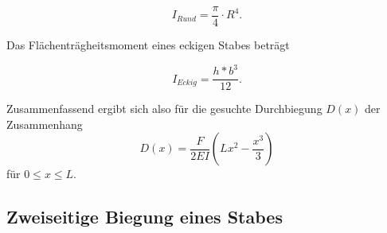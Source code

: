 \begin{equation}
    I_{Rund}= \frac{\pi}{4} \cdot R^4.
    \label{eq:rund}
\end{equation}

\noindent Das Flächenträgheitsmoment eines eckigen Stabes beträgt

\begin{equation}
    I_{Eckig}=\frac{h*b^3}{12}.
    \label{eq:eckig}
\end{equation}



Zusammenfassend ergibt sich also für die gesuchte 
Durchbiegung $D(x)$ der Zusammenhang
\begin{equation}
    D(x) = \frac{F}{2 E I} \left( L x^2 - \frac{x^3}{3} \right)
    \label{eq:8}
\end{equation}
\noindent für $0 \leq x \leq L$.




\subsection{Zweiseitige Biegung eines Stabes}


